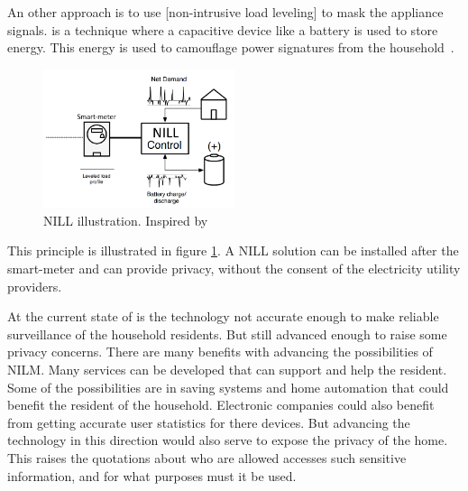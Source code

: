 An other approach is to use [non-intrusive load leveling] to mask the appliance signals.  is a technique where a capacitive device like a battery is used to store energy. This energy is used to camouflage power signatures from the household~\citep{RefWorks:36}. 

\begin{figure}[H]
\centering
\includegraphics[width=0.5\textwidth]{billeder/NILLILU.png}
\caption{NILL illustration. Inspired by \citep{RefWorks:36}}
\label{fig:NILL}
\end{figure}

This principle is illustrated in figure \ref{fig:NILL}. A NILL solution can be installed after the smart-meter and can provide privacy, without the consent of the electricity utility providers.

At the current state of  is the technology not accurate enough to make reliable surveillance of the household residents. But still advanced enough to raise some privacy concerns. There are many benefits with advancing the possibilities of NILM. Many services can be developed that can support and help the resident. Some of the possibilities are in saving systems and home automation that could benefit the resident of the household. Electronic companies could also benefit from getting accurate user statistics for there devices. But advancing the technology in this direction would also serve to expose the privacy of the home. This raises the quotations about who are allowed accesses such sensitive information, and for what purposes must it be used. 